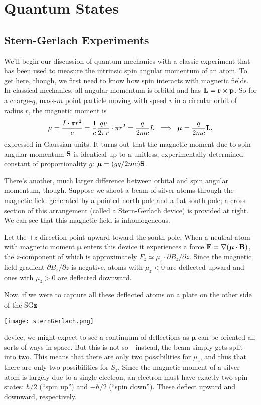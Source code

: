 \documentclass[../p116main.tex]{subfiles}
\begin{document}
\chapter{Quantum States}
\section{Stern-Gerlach Experiments}
We'll begin our discussion of quantum mechanics with a classic experiment that has been used to measure the intrinsic spin angular momentum of an atom.
To get here, though, we first need to know how spin interacts with magnetic fields.
In classical mechanics, all angular momentum is orbital and has $\mathbf{L} = \mathbf{r} \times \mathbf{p}$.
So for a charge-$q$, mass-$m$ point particle moving with speed $v$ in a circular orbit of radius $r$, the magnetic moment is
\[ \mu = \frac{I \cdot \pi r^2}{c} = \frac{1}{c} \frac{qv}{2\pi r} \cdot \pi r^2 = \frac{q}{2mc} L \;\implies\; \bm \mu = \frac{q}{2mc} \mathbf{L}, \]
expressed in Gaussian units.
It turns out that the magnetic moment due to spin angular momentum $\mathbf{S}$ is identical up to a unitless, experimentally-determined constant of proportionality $g$: $\bm \mu = (gq / 2mc) \mathbf{S}$.

\parbox{0.85\textwidth}{
    There's another, much larger difference between orbital and spin angular momentum, though.
    Suppose we shoot a beam of silver atoms through the magnetic field generated by a pointed north pole and a flat south pole; a cross section of this arrangement (called a Stern-Gerlach device) is provided at right.
    We can see that this magnetic field is inhomogeneous.
    \vspace{6pt}

    Let the $+z$-direction point upward toward the south pole.
    When a neutral atom with magnetic moment $\bm \mu$ enters this device it experiences a force $\mathbf{F} = \nabla (\bm \mu \cdot \mathbf{B})$, the $z$-component of which is approximately $F_z \simeq \mu_z \cdot \partial B_z / \partial z$.
    Since the magnetic field gradient $\partial B_z / \partial z$ is negative, atoms with $\mu_z < 0$ are deflected upward and ones with $\mu_z > 0$ are deflected downward.
    \vspace{6pt}

    Now, if we were to capture all these deflected atoms on a plate on the other side of the SG$\mathbf{z}$
}\parbox{0.15\textwidth}{
    \quad\;
    \texttt{[image: sternGerlach.png]}
}

\vspace{-4pt}
device, we might expect to see a continuum of deflections as $\bm \mu$ can be oriented all sorts of ways in space.
But this is not so---instead, the beam simply gets split into two.
This means that there are only two possibilities for $\mu_z$, and thus that there are only two possibilities for $S_z$.
Since the magnetic moment of a silver atom is largely due to a single electron, an electron must have exactly two spin states: $\hbar / 2$ (``spin up'') and $-\hbar / 2$ (``spin down'').
These deflect upward and downward, respectively.
\end{document}
